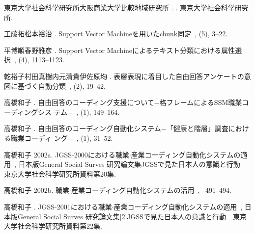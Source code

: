 \documentclass{nlp}
\begin{document}
\begin{thebibliography}{}
東京大学社会科学研究所大阪商業大学比較地域研究所 \BBCP.
\newblock {}.
\newblock 東京大学社会科学研究所.

工藤拓\JBA  松本裕治 \BBCP.
\newblock \JBOQ Support Vector Machineを用いたchunk同定\JBCQ\
\newblock {}, {}  (5), 3--22.

平博順\JBA  春野雅彦 \BBCP.
\newblock \JBOQ Support Vector Machineによるテキスト分類における属性選択\JBCQ\
\newblock {}, {}  (4), 1113--1123.

乾裕子\JBA 村田真樹\JBA 内元清貴\JBA  伊佐原均 \BBOP 2003\BBCP.
\newblock \JBOQ
  表層表現に着目した自由回答アンケートの意図に基づく自動分類\JBCQ\
\newblock {}, {}  (2), 19--42.

高橋和子 \BBOP 2000\BBCP.
\newblock \JBOQ
  自由回答のコーディング支援について−格フレームによるSSM職業コーディングシス
テム−\JBCQ\
\newblock {}, {}  (1), 149--164.

高橋和子 \BBCP.
\newblock \JBOQ
  自由回答のコーディング自動化システム−「健康と階層」調査における職業コーディ
ング−\JBCQ\
\newblock \Jem{敬愛大学国際研究}, {\Bbf 8}  (1), 31--52.

高橋和子 \BBOP 2002a\BBCP.
\newblock \JBOQ
  JGSS-2000における職業$\cdot$産業コーディング自動化システムの適用\JBCQ\
\newblock \JTR, 日本版General Social Surves
  研究論文集JGSSで見た日本人の意識と行動　東京大学社会科学研究所資料第20集.

高橋和子 \BBOP 2002b\BBCP.
\newblock \JBOQ 職業$\cdot$産業コーディング自動化システムの活用\JBCQ\
\newblock {}, \BPGS\ 491--494.

高橋和子 \BBCP.
\newblock \JBOQ
  JGSS-2001における職業$\cdot$産業コーディング自動化システムの適用\JBCQ\
\newblock \JTR, 日本版General Social Surves
  研究論文集[2]JGSSで見た日本人の意識と行動　東京大学社会科学研究所資料第22集.


\end{thebibliography}
\end{document}
